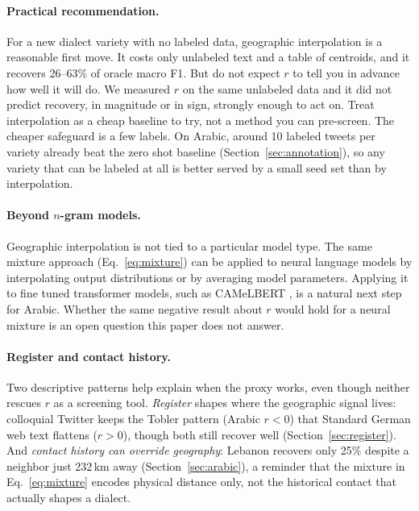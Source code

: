 \documentclass[11pt]{article}
\begin{document}
\paragraph{Practical recommendation.}
For a new dialect variety with no labeled data, geographic interpolation is a reasonable first move.
It costs only unlabeled text and a table of centroids, and it recovers 26--63\% of oracle macro F1.
But do not expect $r$ to tell you in advance how well it will do.
We measured $r$ on the same unlabeled data and it did not predict recovery, in magnitude or in sign, strongly enough to act on.
Treat interpolation as a cheap baseline to try, not a method you can pre-screen.
The cheaper safeguard is a few labels.
On Arabic, around 10 labeled tweets per variety already beat the zero shot baseline (Section~\ref{sec:annotation}), so any variety that can be labeled at all is better served by a small seed set than by interpolation.

\paragraph{Beyond $n$-gram models.}
Geographic interpolation is not tied to a particular model type.
The same mixture approach (Eq.~\ref{eq:mixture}) can be applied to neural language models by interpolating output distributions or by averaging model parameters.
Applying it to fine tuned transformer models, such as CAMeLBERT \cite{inoue-etal-2021-interplay}, is a natural next step for Arabic.
Whether the same negative result about $r$ would hold for a neural mixture is an open question this paper does not answer.

\paragraph{Register and contact history.}
Two descriptive patterns help explain when the proxy works, even though neither rescues $r$ as a screening tool.
\emph{Register} shapes where the geographic signal lives: colloquial Twitter keeps the Tobler pattern (Arabic $r{<}0$) that Standard German web text flattens ($r{>}0$), though both still recover well (Section~\ref{sec:register}).
And \emph{contact history can override geography}: Lebanon recovers only 25\% despite a neighbor just 232\,km away (Section~\ref{sec:arabic}), a reminder that the mixture in Eq.~\ref{eq:mixture} encodes physical distance only, not the historical contact that actually shapes a dialect.
\end{document}

